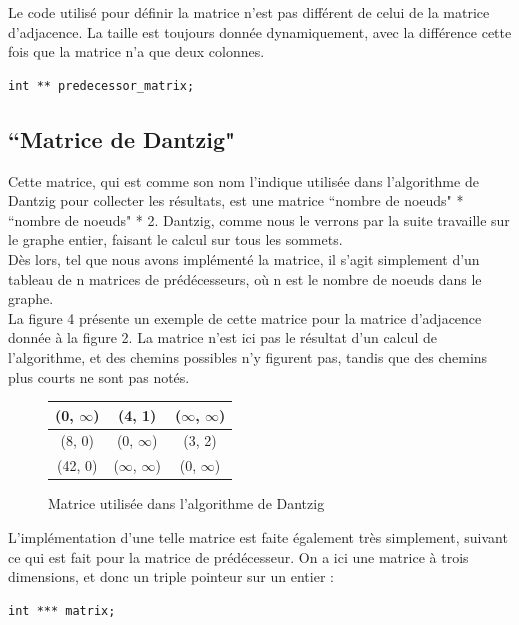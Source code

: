 \documentclass[a4paper,12pt,final] {article}
\begin{document}
Le code utilisé pour définir la matrice n'est pas différent de celui de la matrice d'adjacence. La taille est toujours donnée dynamiquement, avec la différence cette fois que la matrice n'a que deux colonnes.
\begin{lstlisting}
int ** predecessor_matrix;
\end{lstlisting}

\subsection{``Matrice de Dantzig"}

Cette matrice, qui est comme son nom l'indique utilisée dans l'algorithme de Dantzig pour collecter les résultats, est une matrice ``nombre de noeuds" * ``nombre de noeuds" * 2. Dantzig, comme nous le verrons par la suite travaille sur le graphe entier, faisant  le calcul sur tous les sommets.\\

Dès lors, tel que nous avons implémenté la matrice, il s'agit simplement d'un tableau de n matrices de prédécesseurs, où n est le nombre de noeuds dans le graphe.\\

La figure 4 présente un exemple de cette matrice pour la matrice d'adjacence donnée à la figure 2. La matrice n'est ici pas le résultat d'un calcul de l'algorithme, et des chemins possibles n'y figurent pas, tandis que des chemins plus courts ne sont pas notés.\\ %

\begin{figure}[htdp]
\begin{center}
\begin{tabular}{|c|c|c|}
\hline
(0, $\infty$) & (4, 1) & ($\infty$, $\infty$) \\
\hline
(8, 0) & (0, $\infty$) & (3, 2)\\
\hline
(42, 0) & ($\infty$, $\infty$) & (0, $\infty$)\\ 
\hline
\end{tabular}
\end{center}
\caption{Matrice utilisée dans l'algorithme de Dantzig}
\end{figure}

L'implémentation d'une telle matrice est faite également très simplement, suivant ce qui est fait pour la matrice de prédécesseur. On a ici une matrice à trois dimensions, et donc un triple pointeur sur un entier :
\begin{lstlisting}
int *** matrix;
\end{lstlisting}
\end{document}
